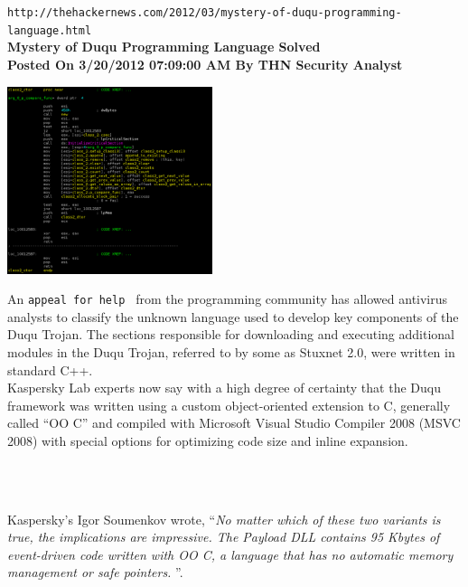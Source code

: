 \documentclass[11pt,twoside,a4paper]{article}
\begin{document}
\texttt{http://thehackernews.com/2012/03/mystery-of-duqu-programming-language.html}~\\



\textbf{\LARGE Mystery of Duqu Programming Language Solved}~\\

\textbf{\small Posted On 3/20/2012 07:09:00 AM By THN Security Analyst}~\\

\begin{minipage}[ht]{6.25cm}
	\includegraphics[width=6.00cm]{img/MysteryOfDuquProgrammingLanguageSolved.png}
\end{minipage} \hfill \begin{minipage}[ht]{12.50cm}
	\small
	An \texttt{appeal for help~\footnotemark} from the programming community has allowed antivirus analysts to classify the unknown language used to develop key components of the Duqu Trojan. The sections responsible for downloading and executing additional modules in the Duqu Trojan, referred to by some as Stuxnet 2.0, were written in standard C++.~\\

	Kaspersky Lab experts now say with a high degree of certainty that the Duqu framework was written using a custom object-oriented extension to C, generally called ``OO C'' and compiled with Microsoft Visual Studio Compiler 2008 (MSVC 2008) with special options for optimizing code size and inline expansion.~\\
\end{minipage}~\\
~

Kaspersky's Igor Soumenkov wrote, ``\emph{No matter which of these two variants is true, the implications are impressive. The Payload DLL contains 95 Kbytes of event-driven code written with OO C, a language that has no automatic memory management or safe pointers. }''.~\\
\end{document}
